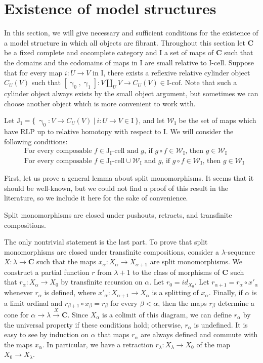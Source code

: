 \documentclass{tac}
\theoremstyle{definition}
\newcommand{\we}{\mathcal{W}}
\newcommand{\cat}[1]{\mathbf{#1}}
\newcommand{\C}{\cat{C}}
\newcommand{\I}{\mathrm{I}}
\newcommand{\J}{\mathrm{J}}
\newcommand{\class}[2]{#1\text{-}\mathrm{#2}}
\newcommand{\Icell}[1][\I]{\class{#1}{cell}}
\newcommand{\Icof}[1][\I]{\class{#1}{cof}}
\newcommand{\Jcell}[1][]{\Icell[\J#1]}
\newcommand{\cyli}{\upgamma}
\begin{document}
\section{Existence of model structures}
\label{sec:exist}

In this section, we will give necessary and sufficient conditions for the existence of a model structure in which all objects are fibrant.
Throughout this section let $\C$ be a fixed complete and cocomplete category and $\I$ a set of maps of $\C$
such that the domains and the codomains of maps in $\I$ are small relative to $\Icell$.
Suppose that for every map $i : U \to V$ in $\I$, there exists a reflexive relative cylinder object $C_U(V)$ such that $[\cyli_0,\cyli_1] : V \amalg_U V \to C_U(V) \in \Icof$.
Note that such a cylinder object always exists by the small object argument, but sometimes we can choose another object which is more convenient to work with.

Let $\J_\I = \{\ \cyli_0 : V \to C_U(V)\ |\ i : U \to V \in \I \ \}$, and
let $\we_\I$ be the set of maps which have RLP up to relative homotopy with respect to $\I$.
We will consider the following conditions:
\begin{align}
& \text{For every composable $f \in \Jcell[_\I]$ and $g$, if $g \circ f \in \we_\I$, then $g \in \we_\I$} \label{cond:main} \tag{*} \\
& \text{For every composable $f \in \Jcell[_\I] \cup \we_\I$ and $g$, if $g \circ f \in \we_\I$, then $g \in \we_\I$} \label{cond:strong-main} \tag{*'}
\end{align}

First, let us prove a general lemma about split monomorphisms.
It seems that it should be well-known, but we could not find a proof of this result in the literature, so we include it here for the sake of convenience.

\begin{lem}
Split monomorphisms are closed under pushouts, retracts, and transfinite compositions.
\end{lem}
\proof
The only nontrivial statement is the last part.
To prove that split monomorphisms are closed under transfinite compositions, consider a $\lambda$-sequence $X : \lambda \to \C$ such that the maps $x_\alpha : X_\alpha \to X_{\alpha+1}$ are split monomorphisms.
We construct a partial function $r$ from $\lambda+1$ to the class of morphisms of $\C$ such that $r_\alpha : X_\alpha \to X_0$ by transfinite recursion on $\alpha$.
Let $r_0 = id_{X_0}$.
Let $r_{\alpha+1} = r_\alpha \circ x'_\alpha$ whenever $r_\alpha$ is defined, where $x'_\alpha : X_{\alpha+1} \to X_\alpha$ is a splitting of $x_\alpha$.
Finally, if $\alpha$ is a limit ordinal and $r_{\beta+1} \circ x_\beta = r_\beta$ for every $\beta < \alpha$,
then the maps $r_\beta$ determine a cone for $\alpha \to \lambda \xrightarrow{X} \C$.
Since $X_\alpha$ is a colimit of this diagram, we can define $r_\alpha$ by the universal property if these conditions hold; otherwise, $r_\alpha$ is undefined.
It is easy to see by induction on $\alpha$ that maps $r_\alpha$ are always defined and commute with the maps $x_\alpha$.
In particular, we have a retraction $r_\lambda : X_\lambda \to X_0$ of the map $X_0 \to X_\lambda$.
\endproof
\end{document}
